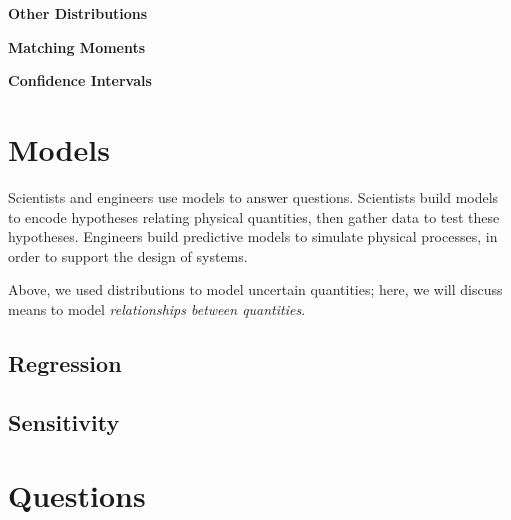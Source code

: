 \documentclass[../primer.tex]{subfiles}
\begin{document}
\noindent\textbf{Other Distributions}


\noindent\textbf{Matching Moments}


\noindent\textbf{Confidence Intervals}

\section{Models}
Scientists and engineers use models to answer questions. Scientists build models
to encode hypotheses relating physical quantities, then gather data to test
these hypotheses. Engineers build predictive models to simulate physical
processes, in order to support the design of systems.

Above, we used distributions to model uncertain quantities; here, we will
discuss means to model \emph{relationships between quantities}.

\subsection{Regression}

\subsection{Sensitivity}


\section{Questions}
\end{document}
